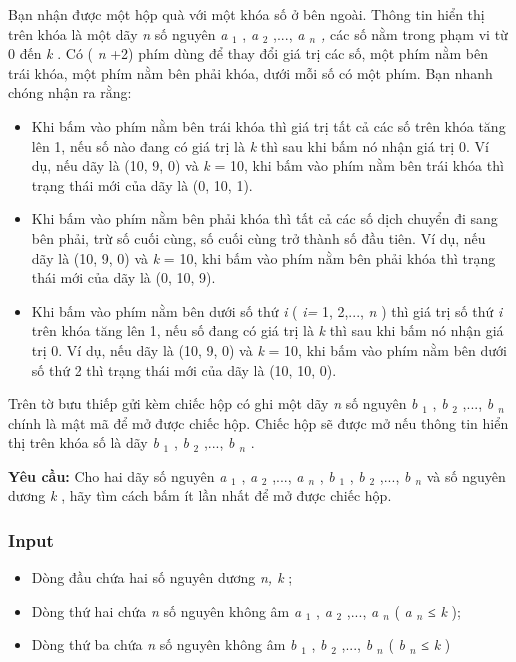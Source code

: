 

Bạn nhận được một hộp quà với một khóa số ở bên ngoài. Thông tin hiển thị trên khóa là một dãy \emph{ n } số nguyên \emph{ a }$_ 1 $ , \emph{ a }$_ 2 $ ,..., \emph{ a $_ n $ , } các số nằm trong phạm vi từ 0 đến \emph{ k } . Có ( \emph{ n } +2) phím dùng để thay đổi giá trị các số, một phím nằm bên trái khóa, một phím nằm bên phải khóa, dưới mỗi số có một phím. Bạn nhanh chóng nhận ra rằng:
\begin{itemize}
	\item Khi bấm vào phím nằm bên trái khóa thì giá trị tất cả các số trên khóa tăng lên 1, nếu số nào đang có giá trị là \emph{ k } thì sau khi bấm nó nhận giá trị 0. Ví dụ, nếu dãy là (10, 9, 0) và \emph{ k } = 10, khi bấm vào phím nằm bên trái khóa thì trạng thái mới của dãy là (0, 10, 1).
	\item Khi bấm vào phím nằm bên phải khóa thì tất cả các số dịch chuyển đi sang bên phải, trừ số cuối cùng, số cuối cùng trở thành số đầu tiên. Ví dụ, nếu dãy là (10, 9, 0) và \emph{ k } = 10, khi bấm vào phím nằm bên phải khóa thì trạng thái mới của dãy là (0, 10, 9).
	\item Khi bấm vào phím nằm bên dưới số thứ \emph{ i } ( \emph{ i= } 1, 2,..., \emph{ n } ) thì giá trị số thứ \emph{ i } trên khóa tăng lên 1, nếu số đang có giá trị là \emph{ k } thì sau khi bấm nó nhận giá trị 0. Ví dụ, nếu dãy là (10, 9, 0) và \emph{ k } = 10, khi bấm vào phím nằm bên dưới số thứ 2 thì trạng thái mới của dãy là (10, 10, 0).
\end{itemize}

Trên tờ bưu thiếp gửi kèm chiếc hộp có ghi một dãy \emph{ n } số nguyên \emph{ b }$_ 1 $ , \emph{ b }$_ 2 $ ,..., \emph{ b $_ n $} chính là mật mã để mở được chiếc hộp. Chiếc hộp sẽ được mở nếu thông tin hiển thị trên khóa số là dãy \emph{ b }$_ 1 $ , \emph{ b }$_ 2 $ ,..., \emph{ b $_ n $} .

\textbf{Yêu cầu: } Cho hai dãy số nguyên \emph{ a }$_ 1 $ , \emph{ a }$_ 2 $ ,..., \emph{ a $_ n $} , \emph{ b }$_ 1 $ , \emph{ b }$_ 2 $ ,..., \emph{ b $_ n $} và số nguyên dương \emph{ k } , hãy tìm cách bấm ít lần nhất để mở được chiếc hộp.

\subsubsection{Input}
\begin{itemize}
	\item Dòng đầu chứa hai số nguyên dương \emph{ n, k } ;
	\item Dòng thứ hai chứa \emph{ n } số nguyên không âm \emph{ a }$_ 1 $ , \emph{ a }$_ 2 $ ,..., \emph{ a $_ n $} ( \emph{ a $_ n $} ≤ \emph{ k } );
	\item Dòng thứ ba chứa \emph{ n } số nguyên không âm \emph{ b }$_ 1 $ , \emph{ b }$_ 2 $ ,..., \emph{ b $_ n $} ( \emph{ b $_ n $} ≤ \emph{ k } )
\end{itemize}

